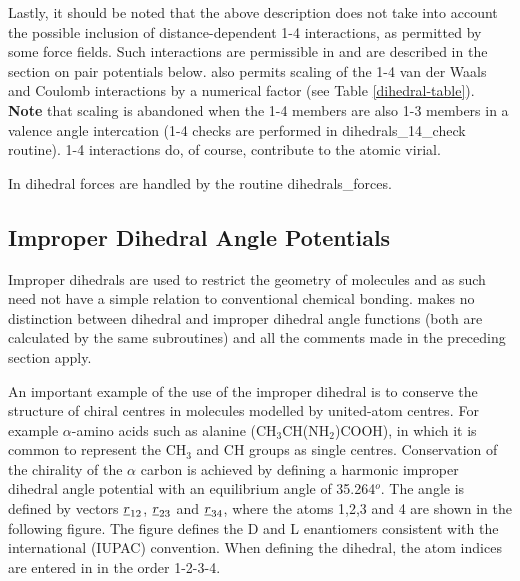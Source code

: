 Lastly, it should be noted that the above description does not
take into account the possible inclusion of distance-dependent 1-4
interactions, as permitted by some force fields.  Such interactions are permissible in \D and are described
in the section on pair potentials below.  \D also permits scaling
of the 1-4 van der Waals and Coulomb
 interactions by a numerical
factor (see Table \ref{dihedral-table}).  {\bf Note} that scaling
is abandoned when the 1-4 members are also 1-3 members in a valence
angle intercation (1-4 checks are
performed in {\sc dihedrals\_14\_check} routine).  1-4 interactions
do, of course, contribute to the atomic virial.

In \D dihedral forces are handled by the routine {\sc dihedrals\_forces}.

\subsection{Improper Dihedral Angle Potentials}

Improper dihedrals are used to
restrict the geometry of molecules and as such need not have a
simple relation to conventional chemical
bonding.  \D makes no distinction between
dihedral and improper
dihedral angle functions (both
are calculated by the same subroutines) and all the comments made
in the preceding section apply.

An important example of the use of the improper
dihedral is to conserve the
structure of chiral centres in molecules modelled by united-atom
centres. For example $\alpha$-amino acids such as alanine
(CH$_{3}$CH(NH$_{2}$)COOH), in which it is common to represent the
CH$_{3}$ and CH groups as single centres.  Conservation of the
chirality of the $\alpha$ carbon is achieved by defining a
harmonic improper dihedral angle
potential with an equilibrium angle of 35.264$^{o}$.  The angle is
defined by vectors $\mbox{$\underline{r}$}_{12}$, $\mbox{$\underline{r}$}_{23}$ and
$\mbox{$\underline{r}$}_{34}$, where the atoms 1,2,3 and 4 are shown in the
following figure.  The figure defines the D and L enantiomers
consistent with the international (IUPAC) convention.  When
defining the dihedral, the atom indices
are entered in \D in the order 1-2-3-4.

